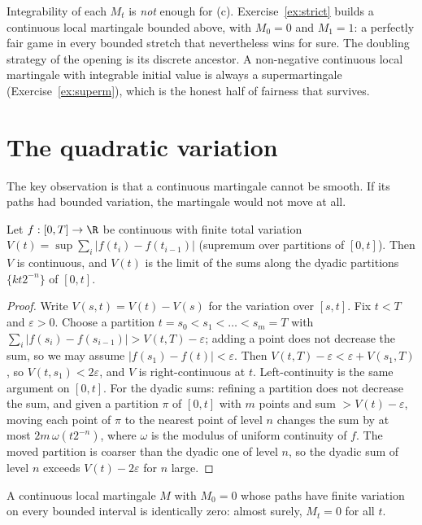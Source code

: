 \begin{remark}
Integrability of each $M_t$ is \emph{not} enough for (c). Exercise~\ref{ex:strict} builds a continuous local martingale bounded above, with $M_0=0$ and $M_1=1$: a perfectly fair game in every bounded
stretch that nevertheless wins for sure. The doubling strategy of the opening is its discrete ancestor. A non-negative continuous local martingale with integrable initial value is always a supermartingale (Exercise~\ref{ex:superm}),
which is the honest half of fairness that survives.
\end{remark}

\section{The quadratic variation}

The key observation is that a continuous martingale cannot be smooth. If its paths had bounded variation, the martingale would not move at all.

\begin{lemma}\label{lem:variation}
Let $f:[0,T]\to\R$ be continuous with finite total variation $V(t)=\sup\sum_i|f(t_i)-f(t_{i-1})|$ (supremum over partitions of $[0,t]$). Then $V$ is continuous, and $V(t)$ is the limit of the sums along the dyadic
partitions $\{kt2^{-n}\}$ of $[0,t]$.
\end{lemma}

\begin{proof}
Write $V(s,t)=V(t)-V(s)$ for the variation over $[s,t]$. Fix $t<T$ and $\varepsilon>0$. Choose a partition $t=s_0<s_1<\dots<s_m=T$ with $\sum_i|f(s_i)-f(s_{i-1})|>V(t,T)-\varepsilon$; adding a point does not decrease the
sum, so we may assume $|f(s_1)-f(t)|<\varepsilon$. Then $V(t,T)-\varepsilon<\varepsilon+V(s_1,T)$, so $V(t,s_1)<2\varepsilon$, and $V$ is right-continuous at $t$. Left-continuity is the same argument on $[0,t]$.
For the dyadic sums: refining a partition does not decrease the sum, and given a partition $\pi$ of $[0,t]$ with $m$ points and sum $>V(t)-\varepsilon$, moving each point of $\pi$ to the nearest point of
level $n$ changes the sum by at most $2m\,\omega(t2^{-n})$, where $\omega$ is the modulus of uniform continuity of $f$. The moved partition is coarser than the dyadic one of level $n$, so the dyadic sum
of level $n$ exceeds $V(t)-2\varepsilon$ for $n$ large.
\end{proof}

\begin{theorem}\label{thm:fvconstant}
A continuous local martingale $M$ with $M_0=0$ whose paths have finite variation on every bounded interval is identically zero: almost surely, $M_t=0$ for all $t$.
\end{theorem}

